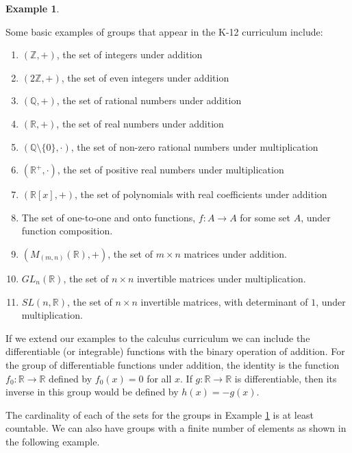 \documentclass[
]{book}
\theoremstyle{definition}
\theoremstyle{definition}
\newtheorem{example}{Example}[chapter]
\theoremstyle{definition}
\theoremstyle{definition}
\theoremstyle{remark}
\begin{document}
\begin{example}
\protect\hypertarget{exm:group-list}{}\label{exm:group-list}

Some basic examples of groups that appear in the K-12 curriculum include:

\begin{enumerate}
\def\labelenumi{\arabic{enumi}.}
\item
  \((\mathbb{Z},+)\), the set of integers under addition
\item
  \((2\mathbb{Z},+)\), the set of even integers under addition
\item
  \((\mathbb{Q},+)\), the set of rational numbers under addition
\item
  \((\mathbb{R},+)\), the set of real numbers under addition
\item
  \((\mathbb{Q}\setminus\{0\} , \cdot)\), the set of non-zero rational numbers under multiplication
\item
  \(( \mathbb{R}^+, \cdot)\), the set of positive real numbers under multiplication
\item
  \(\left( \mathbb{R}[x], +\right)\), the set of polynomials with real coefficients under addition
\item
  The set of one-to-one and onto functions, \(f:A\rightarrow A\) for some set \(A\), under function composition.
\item
  \(\left( M_{(m,n)}(\mathbb{R}), + \right)\), the set of \(m \times n\) matrices under addition.
\item
  \(GL_n(\mathbb{R})\), the set of \(n \times n\) invertible matrices under multiplication.
\item
  \(SL(n,\mathbb{R})\), the set of \(n \times n\) invertible matrices, with determinant of \(1\), under multiplication.\\
\end{enumerate}

\end{example}

If we extend our examples to the calculus curriculum we can include the differentiable (or integrable) functions with the binary operation of addition. For the group of differentiable functions under addition, the identity is the function \(f_0:\mathbb{R}\rightarrow \mathbb{R}\) defined by \(f_0(x)=0\) for all \(x\). If \(g:\mathbb{R}\rightarrow \mathbb{R}\) is differentiable, then its inverse in this group would be defined by \(h(x)=-g(x)\).

The cardinality of each of the sets for the groups in Example \ref{exm:group-list} is at least countable. We can also have groups with a finite number of elements as shown in the following example.
\end{document}
